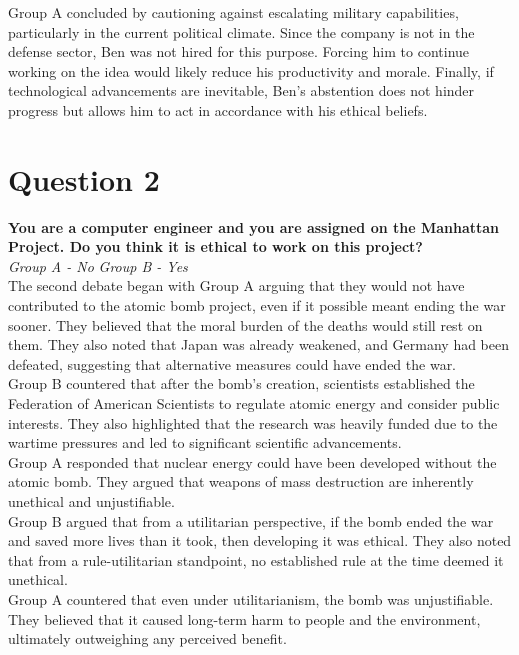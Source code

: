 \documentclass[12pt]{article}
\begin{document}
Group A concluded by cautioning against escalating military capabilities, particularly in the current political climate. Since the company is not in the defense sector, Ben was not hired for this purpose. Forcing him to continue working on the idea would likely reduce his productivity and morale. Finally, if technological advancements are inevitable, Ben’s abstention does not hinder progress but allows him to act in accordance with his ethical beliefs.\\

\pagebreak
\section{Question 2}
\textbf{You are a computer engineer and you are assigned on the Manhattan Project. Do you think it is ethical to work on this project?}\\
\textit {Group A - No}
\textit {Group B - Yes}\\

The second debate began with Group A arguing that they would not have contributed to the atomic bomb project, even if it possible meant ending the war sooner. They believed that the moral burden of the deaths would still rest on them. They also noted that Japan was already weakened, and Germany had been defeated, suggesting that alternative measures could have ended the war.\\

Group B countered that after the bomb’s creation, scientists established the Federation of American Scientists to regulate atomic energy and consider public interests. They also highlighted that the research was heavily funded due to the wartime pressures and led to significant scientific advancements.\\

Group A responded that nuclear energy could have been developed without the atomic bomb. They argued that weapons of mass destruction are inherently unethical and unjustifiable.\\

Group B argued that from a utilitarian perspective, if the bomb ended the war and saved more lives than it took, then developing it was ethical. They also noted that from a rule-utilitarian standpoint, no established rule at the time deemed it unethical.\\

Group A countered that even under utilitarianism, the bomb was unjustifiable. They believed that it caused long-term harm to people and the environment, ultimately outweighing any perceived benefit.\\
\end{document}
